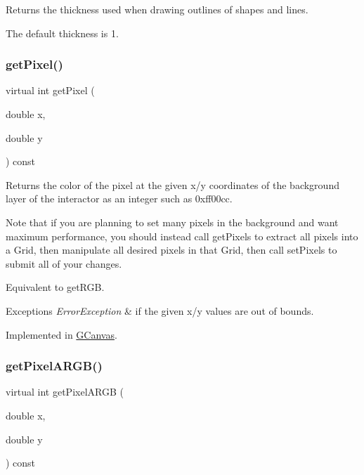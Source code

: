 Returns the thickness used when drawing outlines of shapes and lines. 

The default thickness is 1. \mbox{\label{classsgl_1_1GDrawingSurface_a40f3e3f64a8263e13b7162e15b2979ee}} 
\subsubsection{\texorpdfstring{get\+Pixel()}{getPixel()}}
{\footnotesize\ttfamily virtual int get\+Pixel (\begin{DoxyParamCaption}\item[{double}]{x,  }\item[{double}]{y }\end{DoxyParamCaption}) const\hspace{0.3cm}{\ttfamily [pure virtual]}}



Returns the color of the pixel at the given x/y coordinates of the background layer of the interactor as an integer such as 0xff00cc. 

Note that if you are planning to set many pixels in the background and want maximum performance, you should instead call get\+Pixels to extract all pixels into a Grid, then manipulate all desired pixels in that Grid, then call set\+Pixels to submit all of your changes.

Equivalent to get\+R\+GB.


\begin{DoxyExceptions}{Exceptions}
{\em Error\+Exception} & if the given x/y values are out of bounds. \\
\hline
\end{DoxyExceptions}


Implemented in \mbox{\hyperlink{classsgl_1_1GCanvas_a342aaa6de62a4a324a2e4f3921db1d3e}{G\+Canvas}}.

\mbox{\label{classsgl_1_1GDrawingSurface_aee10de1ca7da1fc3f3fc0e48286f88f8}} 
\subsubsection{\texorpdfstring{get\+Pixel\+A\+R\+G\+B()}{getPixelARGB()}}
{\footnotesize\ttfamily virtual int get\+Pixel\+A\+R\+GB (\begin{DoxyParamCaption}\item[{double}]{x,  }\item[{double}]{y }\end{DoxyParamCaption}) const\hspace{0.3cm}{\ttfamily [pure virtual]}}



